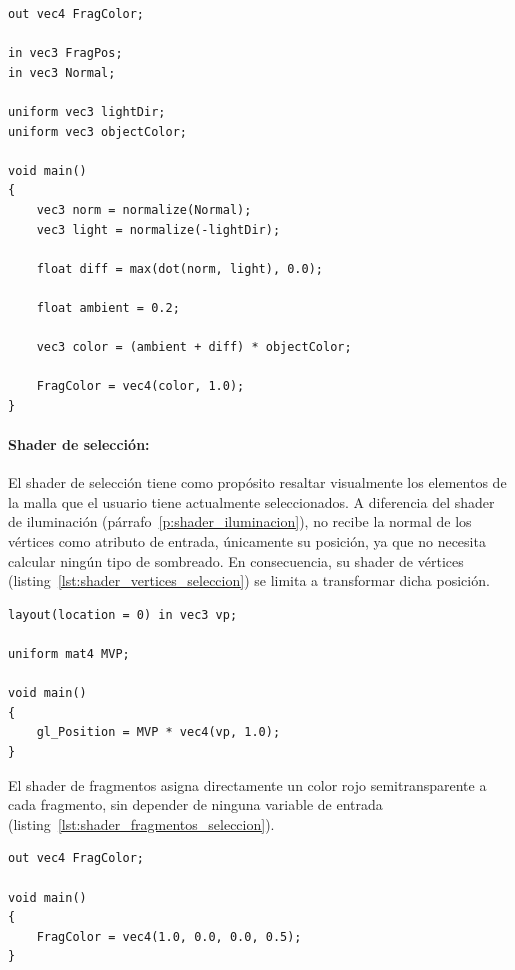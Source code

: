 \begin{listing}[htb]
\begin{verbatim}
out vec4 FragColor;

in vec3 FragPos;
in vec3 Normal;

uniform vec3 lightDir;
uniform vec3 objectColor;

void main()
{
    vec3 norm = normalize(Normal);
    vec3 light = normalize(-lightDir);

    float diff = max(dot(norm, light), 0.0);

    float ambient = 0.2;

    vec3 color = (ambient + diff) * objectColor;

    FragColor = vec4(color, 1.0);
}
\end{verbatim}
\caption{Shader de fragmentos del programa de iluminación.}
\label{lst:shader_fragmentos_iluminacion}
\end{listing}

\paragraph{Shader de selección:}

El shader de selección tiene como propósito resaltar visualmente los elementos de la malla que el usuario tiene actualmente seleccionados. A diferencia del shader de iluminación (párrafo~\ref{p:shader_iluminacion}), no recibe la normal de los vértices como atributo de entrada, únicamente su posición, ya que no necesita calcular ningún tipo de sombreado. En consecuencia, su shader de vértices (listing~\ref{lst:shader_vertices_seleccion}) se limita a transformar dicha posición.

\begin{listing}[htb]
\begin{verbatim}
layout(location = 0) in vec3 vp;

uniform mat4 MVP;

void main()
{
    gl_Position = MVP * vec4(vp, 1.0);
}
\end{verbatim}
\caption{Shader de vértices del programa de selección.}
\label{lst:shader_vertices_seleccion}
\end{listing}

El shader de fragmentos asigna directamente un color rojo semitransparente a cada fragmento, sin depender de ninguna variable de entrada (listing~\ref{lst:shader_fragmentos_seleccion}).

\begin{listing}[htb]
\begin{verbatim}
out vec4 FragColor;

void main()
{
    FragColor = vec4(1.0, 0.0, 0.0, 0.5);
}
\end{verbatim}
\caption{Shader de fragmentos del programa de selección.}
\label{lst:shader_fragmentos_seleccion}
\end{listing}

